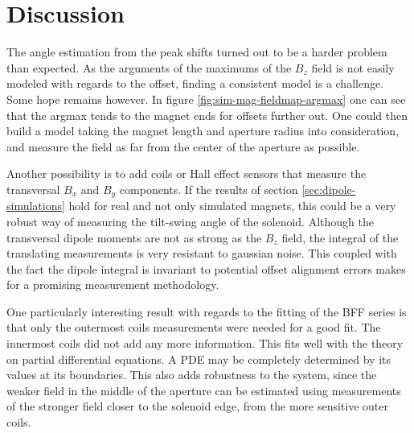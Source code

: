 \chapter{Discussion}
The angle estimation from the peak shifts turned out to be 
a harder problem than expected. As the arguments of the maximums of the
$B_z$ field is not easily modeled with regards to the offset, finding
a consistent model is a challenge. Some hope remains however. In figure
\ref{fig:sim-mag-fieldmap-argmax} one can see that the argmax tends to
the magnet ends for offsets further out. One could then build a model
taking the magnet length and aperture radius into consideration, and measure
the field as far from the center of the aperture as possible.

Another possibility is to add coils or Hall effect sensors that measure
the transversal $B_x$ and $B_y$ components. If the results of section 
\ref{sec:dipole-simulations} hold for real and not only simulated magnets,
this could be a very robust way of measuring the tilt-swing angle of the
solenoid. Although the transversal dipole moments are not as strong as
the $B_z$ field, the integral of the translating measurements is very
resistant to gaussian noise. This coupled with the fact the dipole
integral is invariant to potential offset alignment errors makes for
a promising measurement methodology.

One particularly interesting result with regards to the fitting
of the BFF series is that only the outermost coils measurements
were needed for a good fit. The innermost coils did not add any
more information. This fits well with the theory on partial
differential equations. A PDE may be completely determined
by its values at its boundaries. This also adds robustness to the system,
since the weaker field in the middle of the aperture can be estimated
using measurements of the stronger field closer to the solenoid edge,
from the more sensitive outer coils.